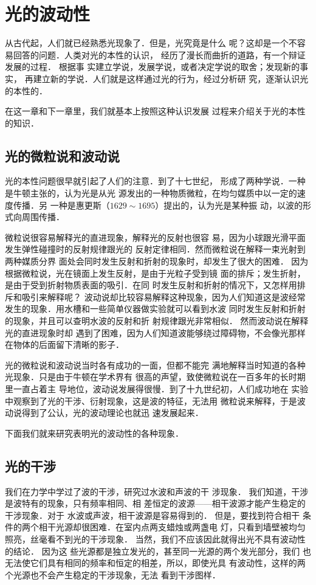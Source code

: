 \chapter{光的波动性}\label{chapter-wave-nature-of-light}

从古代起，人们就已经熟悉光现象了．但是，光究竟是什么
呢？这却是一个不容易回答的问题．人类对光的本性的认识，
经历了漫长而曲折的道路，有一个辩证发展的过程．
根据事
实建立学说，发展学说，或者决定学说的取舍；发现新的事实，
再建立新的学说．人们就是这样通过光的行为，经过分析研
究，逐渐认识光的本性的．

在这一章和下一章里，我们就基本上按照这种认识发展
过程来介绍关于光的本性的知识．

\section{光的微粒说和波动说}
光的本性问题很早就引起了人们的注意．到了十七世纪，
形成了两种学说．一种是牛顿主张的，认为光是从光
源发出的一种物质微粒，在均匀媒质中以一定的速度传播．另
一种是惠更斯（$1629 \sim 1695$）提出的，认为光是某种振
动，以波的形式向周围传播．

微粒说很容易解释光的直进现象，解释光的反射也很容
易，因为小球跟光滑平面发生弹性碰撞时的反射规律跟光的
反射定律相同．然而微粒说在解释一束光射到两种媒质分界
面处会同时发生反射和折射的现象时，却发生了很大的困难．
因为根据微粒说，光在镜面上发生反射，是由于光粒子受到镜
面的排斥；发生折射，是由于受到折射物质表面的吸引．在同
时发生反射和折射的情况下，又怎样用排斥和吸引来解释呢？
波动说却比较容易解释这种现象，因为人们知道这是波经常
发生的现象．用水槽和一些简单仪器做实验就可以看到水波
同时发生反射和折射的现象，并且可以查明水波的反射和折
射规律跟光非常相似．
然而波动说在解释光的直进现象时却
遇到了困难，因为人们知道波能够绕过障碍物，不会像光那样
在物体的后面留下清晰的影子．

光的微粒说和波动说当时各有成功的一面，但都不能完
满地解释当时知道的各种光现象．只是由于牛顿在学术界有
很高的声望，致使微粒说在一百多年的长时期里一直占着主
导地位，波动说发展得很慢．到了十九世纪初，人们成功地在
实验中观察到了光的干涉、衍射现象，这是波的特征，无法用
微粒说来解释，于是波动说得到了公认，光的波动理论也就迅
速发展起来．

下面我们就来研究表明光的波动性的各种现象．

\section{光的干涉}
我们在力学中学过了波的干涉，研究过水波和声波的干
涉现象．
我们知道，干涉是波特有的现象，只有频率相同、相
差恒定的波源——相干波源才能产生稳定的干涉现象．对于
水波或声波，相干波源是容易得到的．
但是，要找到符合相干
条件的两个相干光源却很困难．在室内点两支蜡烛或两盏电
灯，只看到墙壁被均匀照亮，丝毫看不到光的干涉现象．
当然，我们不应该因此就得出光不具有波动性的结论．
因为这
些光源都是独立发光的，甚至同一光源的两个发光部分，我们
也无法使它们具有相同的频率和恒定的相差，所以，即使光具
有波动性，这样的两个光源也不会产生稳定的干涉现象，无法
看到干涉图样．

